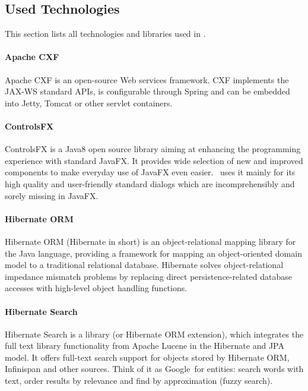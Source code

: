 
\subsection{Used Technologies}

This section lists all technologies and libraries used in \textan.

\paragraph{Apache CXF}
Apache CXF is an open-source Web services framework. CXF implements the JAX-WS 
standard APIs, is configurable through Spring and can be embedded into Jetty,
Tomcat or other servlet containers.

\paragraph{ControlsFX}
ControlsFX is a Java8 open source library aiming at enhancing the programming
experience with standard JavaFX. It provides wide selection of new and improved
components to make everyday use of JavaFX even easier. \textan\ uses it mainly for
its high quality and user-friendly standard dialogs which are incomprehensibly
and sorely missing in JavaFX.

\paragraph{Hibernate ORM}
Hibernate ORM (Hibernate in short) is an object-relational mapping library for
the Java language, providing a framework for mapping an object-oriented domain
model to a traditional relational database. Hibernate solves object-relational
impedance mismatch problems by replacing direct persistence-related database
accesses with high-level object handling functions.

\paragraph{Hibernate Search}
Hibernate Search is a library (or Hibernate ORM extension), which integrates
the full text library functionality from Apache Lucene in the Hibernate and
JPA model. It offers full-text search support for objects stored by Hibernate
ORM, Infinispan and other sources. Think of it as Google\texttrademark\ for
entities: search words with text, order results by relevance and find by
approximation (fuzzy search).


